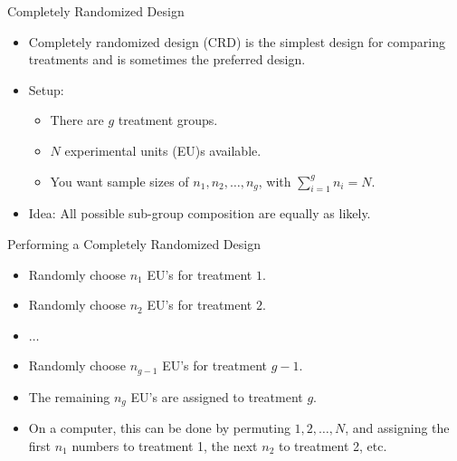 \begin{frame}[allowframebreaks]{Completely Randomized Design}
  \begin{itemize}
    \item Completely randomized design (CRD) is the simplest design for comparing treatments and is sometimes the preferred design. 
    \item \alert{Setup:}
    \begin{itemize}
      \item There are $g$ treatment groups.
      \item $N$ experimental units (EU)s available.
      \item You want sample sizes of $n_1, n_2, \ldots, n_g$, with $\sum_{i = 1}^g n_i = N$. 
    \end{itemize}
  
  \framebreak
  
    \item \alert{Idea}: All possible sub-group composition are equally as likely. 
  \end{itemize}
  
  \begin{block}{Performing a Completely Randomized Design}
    \begin{itemize}
      \item Randomly choose $n_1$ EU's for treatment $1$.
      \item Randomly choose $n_2$ EU's for treatment $2$.
      \item $\ldots$
      \item Randomly choose $n_{g-1}$ EU's for treatment $g-1$.
      \item The remaining $n_g$ EU's are assigned to treatment $g$.
    \end{itemize}
  \end{block}
  
  \begin{itemize}
    \item On a computer, this can be done by permuting $1, 2, \ldots, N$, and assigning the first $n_1$ numbers to treatment 1, the next $n_2$ to treatment 2, etc.
  \end{itemize}
  
\end{frame}

